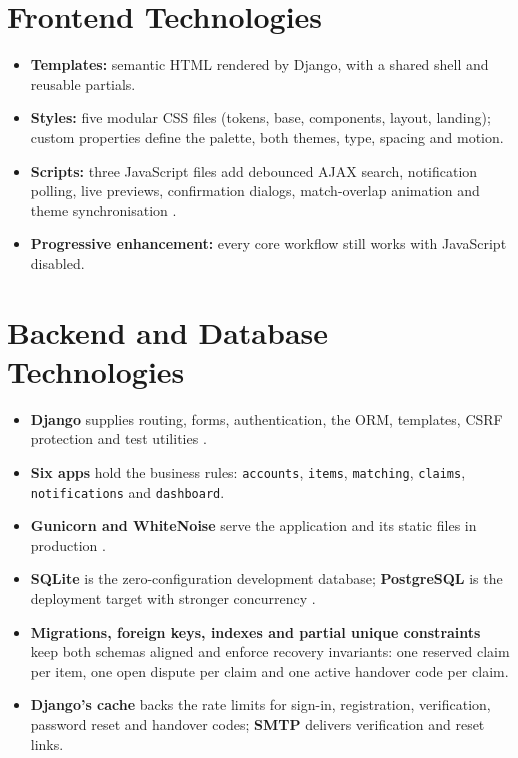 \documentclass[12pt,a4paper,oneside]{report}
\newcommand{\code}[1]{\texttt{#1}}
\begin{document}
\section{Frontend Technologies}
\begin{itemize}
  \item \textbf{Templates:} semantic HTML rendered by Django, with a shared shell and reusable partials.
  \item \textbf{Styles:} five modular CSS files (tokens, base, components, layout, landing); custom properties define the palette, both themes, type, spacing and motion.
  \item \textbf{Scripts:} three JavaScript files add debounced AJAX search, notification polling, live previews, confirmation dialogs, match-overlap animation and theme synchronisation \cite{mdn}.
  \item \textbf{Progressive enhancement:} every core workflow still works with JavaScript disabled.
\end{itemize}

\section{Backend and Database Technologies}
\begin{itemize}
  \item \textbf{Django} supplies routing, forms, authentication, the ORM, templates, CSRF protection and test utilities \cite{django}.
  \item \textbf{Six apps} hold the business rules: \code{accounts}, \code{items}, \code{matching}, \code{claims}, \code{notifications} and \code{dashboard}.
  \item \textbf{Gunicorn and WhiteNoise} serve the application and its static files in production \cite{whitenoise}.
  \item \textbf{SQLite} is the zero-configuration development database; \textbf{PostgreSQL} is the deployment target with stronger concurrency \cite{postgres}.
  \item \textbf{Migrations, foreign keys, indexes and partial unique constraints} keep both schemas aligned and enforce recovery invariants: one reserved claim per item, one open dispute per claim and one active handover code per claim.
  \item \textbf{Django's cache} backs the rate limits for sign-in, registration, verification, password reset and handover codes; \textbf{SMTP} delivers verification and reset links.
\end{itemize}
\end{document}
